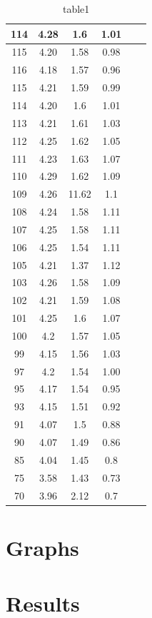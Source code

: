 \documentclass{ieeeconf}
\begin{document}
\begin{table}[H]
{\begin{tabular}{|c|c|c|c|c|c|}
114 & 4.28 & 1.6 & 1.01 &  &  \\ \hline
115 & 4.20 & 1.58 & 0.98 &  &  \\ \hline
116 & 4.18 & 1.57 & 0.96 &  &  \\ \hline
115 & 4.21 & 1.59 & 0.99 &  &  \\ \hline
114 & 4.20 & 1.6 & 1.01 &  &  \\ \hline
113 & 4.21 & 1.61 & 1.03 &  &  \\ \hline
112 & 4.25 & 1.62 & 1.05 &  &  \\ \hline
111 & 4.23 & 1.63 & 1.07 &  &  \\ \hline
110 & 4.29 & 1.62 & 1.09 &  &  \\ \hline
109 & 4.26 & 11.62 & 1.1 &  &  \\ \hline
108 & 4.24 & 1.58 & 1.11 &  &  \\ \hline
107 & 4.25 & 1.58 & 1.11 &  &  \\ \hline
106 & 4.25 & 1.54 & 1.11 &  &  \\ \hline
105 & 4.21 & 1.37 & 1.12 &  &  \\ \hline
103 & 4.26 & 1.58 & 1.09 &  &  \\ \hline
102 & 4.21 & 1.59 & 1.08 &  &  \\ \hline
101 & 4.25 & 1.6 & 1.07 &  &  \\ \hline
100 & 4.2 & 1.57 & 1.05 &  &  \\ \hline
99 & 4.15 & 1.56 & 1.03 &  &  \\ \hline
97 & 4.2 & 1.54 & 1.00 &  &  \\ \hline
95 & 4.17 & 1.54 & 0.95 &  &  \\ \hline
93 & 4.15 & 1.51 & 0.92 &  &  \\ \hline
91 & 4.07 & 1.5 & 0.88 &  &  \\ \hline
90 & 4.07 & 1.49 & 0.86 &  &  \\ \hline
85 & 4.04 & 1.45 & 0.8 &  &  \\ \hline
75 & 3.58 & 1.43 & 0.73 &  &  \\ \hline
70 & 3.96 & 2.12 & 0.7 &  &  \\ \hline

\end{tabular}%
}
\caption{table1}
\label{tbl:"table1"}
\end{table}
\section{Graphs}
\section{Results}
\end{document}
